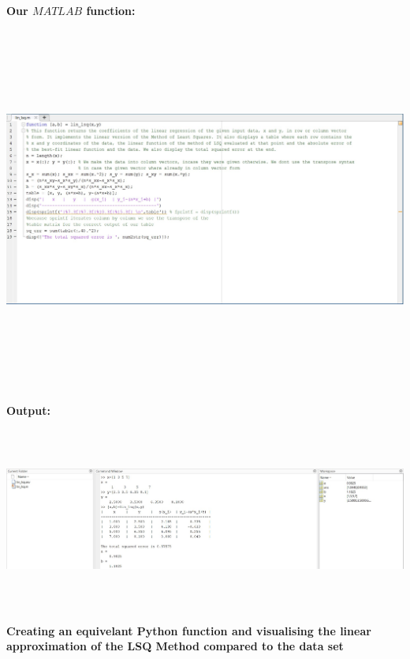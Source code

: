 \documentclass[12pt]{article}
\begin{document}
    


\textbf{Our \(MATLAB\) function:}

\includegraphics[width=16cm, height=12cm]{matlab_code.jpg}

\textbf{Output:}

\includegraphics[width=16cm, height=6cm]{lin_lsq_output.png}
    
\textbf{Creating an equivelant Python function and visualising
the linear approximation of the LSQ Method compared to the data
set}
\end{document}
